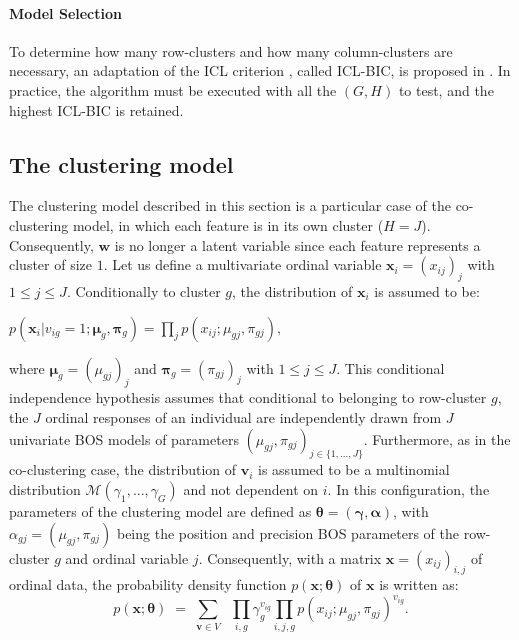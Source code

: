 \paragraph{Model Selection} To determine how many row-clusters and how many column-clusters are necessary, an adaptation of the ICL criterion \citep{Biernacki00}, called ICL-BIC, is proposed in \citet{jacques17}. In practice, the algorithm must be executed with all the $\left(G,H\right)$ to test, and the highest ICL-BIC is retained.

\subsection{The clustering model}
The clustering model described in this section is a particular case of the co-clustering model, in which each feature is in its own cluster ($H=J$). Consequently, $\boldsymbol{w}$ is no longer a latent variable since each feature represents a cluster of size $1$. Let us define a multivariate ordinal variable $\boldsymbol{x}_i = \left(x_{ij}\right)_j$ with $1\leq j \leq J$. Conditionally to cluster $g$, the distribution of $\boldsymbol{x}_i$ is assumed to be: 
\begin{center}
$
p\left(\boldsymbol{x}_i|v_{ig}=1;\boldsymbol{\mu}_g,\boldsymbol{\pi}_g\right) = \underset{j}{\prod}p\left(x_{ij};\mu_{gj},\pi_{gj}\right),
$
\end{center}

\noindent where $\boldsymbol{\mu}_g=\left(\mu_{gj}\right)_j$ and $\boldsymbol{\pi}_g=\left(\pi_{gj}\right)_j$ with $1\leq j \leq J$. This conditional independence hypothesis assumes that conditional to belonging to row-cluster $g$, the $J$ ordinal responses of an individual are independently drawn from $J$ univariate BOS models of parameters $\left(\mu_{gj},\pi_{gj}\right)_{j \in \{1,...,J\}}$. Furthermore, as in the co-clustering case, the distribution of $\boldsymbol{v}_i$ is assumed to be a multinomial distribution $\mathcal{M} \left(\gamma_1,...,\gamma_G\right)$ and not dependent on $i$. In this configuration, the parameters of the clustering model are defined as $\boldsymbol\theta = \left(\boldsymbol{\gamma},\boldsymbol{\alpha}\right)$, with $\alpha_{gj} = \left(\mu_{gj}, \pi_{gj}\right)$ being the position and precision BOS parameters of the row-cluster $g$ and ordinal variable $j$. Consequently, with a matrix $\boldsymbol{x}=\left(x_{ij}\right)_{i,j}$ of ordinal data, the probability density function $p\left(\boldsymbol{x};\boldsymbol{\theta}\right)$ of $\boldsymbol{x}$ is written as:
\begin{equation}
\label{eq:clust}
  p\left(\boldsymbol{x};\boldsymbol{\theta}\right) \;=\;
  \underset{\boldsymbol{v} \in V}{\sum} \;\;
    \underset{i,g}{\prod}\gamma_g^{v_{ig}} 
    \underset{i,j,g}{\prod}p\left(x_{ij};\mu_{gj},\pi_{gj}\right)^{v_{ig}}.
\end{equation}

